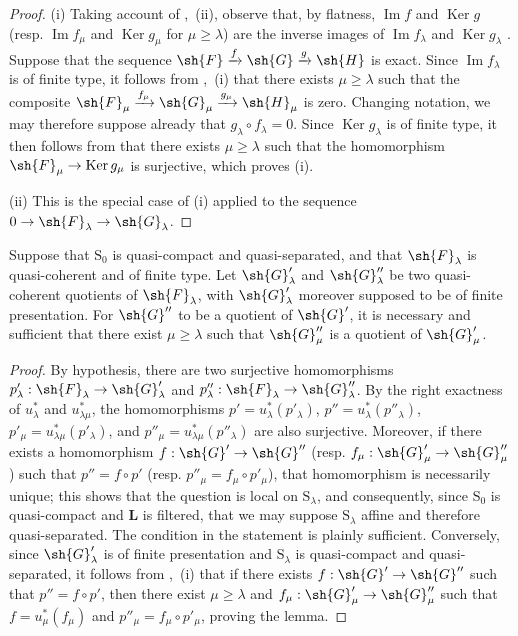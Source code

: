 \begin{proof}
(i) Taking account of ,~(ii), observe that, by flatness, $\operatorname{Im} f$ and $\operatorname{Ker} g$ (resp. $\operatorname{Im} f_\mu$ and $\operatorname{Ker} g_\mu$ for $\mu\geqslant\lambda$) are the inverse images of $\operatorname{Im} f_\lambda$ and $\operatorname{Ker} g_\lambda$ . Suppose that the sequence $\sh{F}\xrightarrow{f}\sh{G}\xrightarrow{g}\sh{H}$ is exact. Since $\operatorname{Im} f_\lambda$ is of finite type, it follows from ,~(i) that there exists $\mu\geqslant\lambda$ such that the composite $\sh{F}_\mu\xrightarrow{f_\mu}\sh{G}_\mu\xrightarrow{g_\mu}\sh{H}_\mu$ is zero. Changing notation, we may therefore suppose already that $g_\lambda\circ f_\lambda=0$. Since $\operatorname{Ker} g_\lambda$ is of finite type, it then follows from  that there exists $\mu\geqslant\lambda$ such that the homomorphism $\sh{F}_\mu\to\operatorname{Ker} g_\mu$ is surjective, which proves (i).

(ii) This is the special case of (i) applied to the sequence $0\to\sh{F}_\lambda\to\sh{G}_\lambda$.
\end{proof}

\begin{lemma}[8.5.9]
\label{IV.8.5.9}
Suppose that $\mathrm{S}_0$ is quasi-compact and quasi-separated, and that $\sh{F}_\lambda$ is quasi-coherent and of finite type. Let $\sh{G}'_\lambda$ and $\sh{G}''_\lambda$ be two quasi-coherent quotients of $\sh{F}_\lambda$, with $\sh{G}'_\lambda$ moreover supposed to be of finite presentation. For $\sh{G}''$ to be a quotient of $\sh{G}'$, it is necessary and sufficient that there exist $\mu\geqslant\lambda$ such that $\sh{G}''_\mu$ is a quotient of $\sh{G}'_\mu$.
\end{lemma}

\begin{proof}
By hypothesis, there are two surjective homomorphisms $p'_\lambda:\sh{F}_\lambda\to\sh{G}'_\lambda$ and $p''_\lambda:\sh{F}_\lambda\to\sh{G}''_\lambda$. By the right exactness of $u_\lambda^*$ and $u_{\lambda\mu}^*$, the homomorphisms $p'=u_\lambda^*(p'_\lambda)$, $p''=u_\lambda^*(p''_\lambda)$, $p'_\mu=u_{\lambda\mu}^*(p'_\lambda)$, and $p''_\mu=u_{\lambda\mu}^*(p''_\lambda)$ are also surjective. Moreover, if there exists a homomorphism $f:\sh{G}'\to\sh{G}''$ (resp. $f_\mu:\sh{G}'_\mu\to\sh{G}''_\mu$) such that $p''=f\circ p'$ (resp. $p''_\mu=f_\mu\circ p'_\mu$), that homomorphism is necessarily unique; this shows that the question is local on $\mathrm{S}_\lambda$, and consequently, since $\mathrm{S}_0$ is quasi-compact and $\mathbf{L}$ is filtered, that we may suppose $\mathrm{S}_\lambda$ affine and therefore quasi-separated. The condition in the statement is plainly sufficient. Conversely, since $\sh{G}'_\lambda$ is of finite presentation and $\mathrm{S}_\lambda$ is quasi-compact and quasi-separated, it follows from ,~(i) that if there exists $f:\sh{G}'\to\sh{G}''$ such that $p''=f\circ p'$, then there exist $\mu\geqslant\lambda$ and $f_\mu:\sh{G}'_\mu\to\sh{G}''_\mu$ such that $f=u_\mu^*(f_\mu)$ and $p''_\mu=f_\mu\circ p'_\mu$, proving the lemma.
\end{proof}

